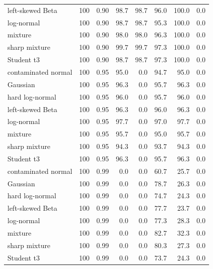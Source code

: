 \begin{longtable}{@{}p{}rrrrrrr@{}}
left-skewed Beta & 100 & 0.90 & 98.7 & 98.7 & 96.0 & 100.0 & 0.0
\\
log-normal & 100 & 0.90 & 98.7 & 98.7 & 95.3 & 100.0 & 0.0
\\
mixture & 100 & 0.90 & 98.0 & 98.0 & 96.3 & 100.0 & 0.0
\\
sharp mixture & 100 & 0.90 & 99.7 & 99.7 & 97.3 & 100.0 & 0.0
\\
Student t3 & 100 & 0.90 & 98.7 & 98.7 & 97.3 & 100.0 & 0.0
\\
contaminated normal & 100 & 0.95 & 95.0 & 0.0 & 94.7 & 95.0 & 0.0
\\
Gaussian & 100 & 0.95 & 96.3 & 0.0 & 95.7 & 96.3 & 0.0
\\
hard log-normal & 100 & 0.95 & 96.0 & 0.0 & 95.7 & 96.0 & 0.0
\\
left-skewed Beta & 100 & 0.95 & 96.3 & 0.0 & 96.0 & 96.3 & 0.0
\\
log-normal & 100 & 0.95 & 97.7 & 0.0 & 97.0 & 97.7 & 0.0
\\
mixture & 100 & 0.95 & 95.7 & 0.0 & 95.0 & 95.7 & 0.0
\\
sharp mixture & 100 & 0.95 & 94.3 & 0.0 & 93.7 & 94.3 & 0.0
\\
Student t3 & 100 & 0.95 & 96.3 & 0.0 & 95.7 & 96.3 & 0.0
\\
contaminated normal & 100 & 0.99 & 0.0 & 0.0 & 60.7 & 25.7 & 0.0
\\
Gaussian & 100 & 0.99 & 0.0 & 0.0 & 78.7 & 26.3 & 0.0
\\
hard log-normal & 100 & 0.99 & 0.0 & 0.0 & 74.7 & 24.3 & 0.0
\\
left-skewed Beta & 100 & 0.99 & 0.0 & 0.0 & 77.7 & 23.7 & 0.0
\\
log-normal & 100 & 0.99 & 0.0 & 0.0 & 77.3 & 28.3 & 0.0
\\
mixture & 100 & 0.99 & 0.0 & 0.0 & 82.7 & 32.3 & 0.0
\\
sharp mixture & 100 & 0.99 & 0.0 & 0.0 & 80.3 & 27.3 & 0.0
\\
Student t3 & 100 & 0.99 & 0.0 & 0.0 & 73.7 & 24.3 & 0.0
\\
\bottomrule
\end{longtable}
